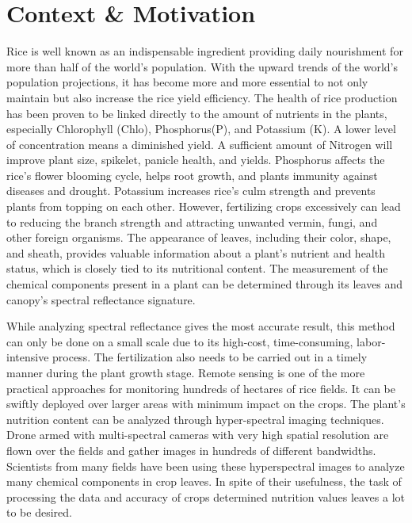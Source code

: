 \section{Context \& Motivation}

Rice is well known as an indispensable ingredient providing daily nourishment for more than half of the world's population.
With the upward trends of the world's population projections,
it has become more and more essential to not only maintain but also increase the rice yield efficiency.
The health of rice production has been proven to be linked directly to the amount of nutrients in the plants,
especially Chlorophyll (Chlo), Phosphorus(P), and Potassium (K).
A lower level of concentration means a diminished yield.
A sufficient amount of Nitrogen will improve plant size, spikelet, panicle health, and yields.
Phosphorus affects the rice's flower blooming cycle, helps root growth, and plants immunity against diseases and drought. \cite{hindersah2022rice}
Potassium increases rice's culm strength and prevents plants from topping on each other.
However, fertilizing crops excessively can lead to reducing the branch strength and attracting unwanted
vermin, fungi, and other foreign organisms.
The appearance of leaves, including their color, shape, and sheath, provides valuable information
about a plant's nutrient and health status,
which is closely tied to its nutritional content.
The measurement of the chemical components present in a plant can be determined through its leaves and canopy's spectral reflectance signature.

While analyzing spectral reflectance gives the most accurate result,
this method can only be done on a small scale due to its high-cost, time-consuming, labor-intensive process.
The fertilization also needs to be carried out in a timely manner during the plant growth stage.
Remote sensing is one of the more practical approaches for monitoring hundreds of hectares of rice fields.
It can be swiftly deployed over larger areas with minimum impact on the crops.
The plant's nutrition content can be analyzed through hyper-spectral imaging techniques.
Drone armed with multi-spectral cameras with very high spatial resolution are flown over the fields
and gather images in hundreds of different bandwidths.
Scientists from many fields have been using these hyperspectral images to analyze many chemical components in crop leaves.
In spite of their usefulness, the task of processing the data and accuracy of crops determined nutrition values leaves a lot to be desired.



